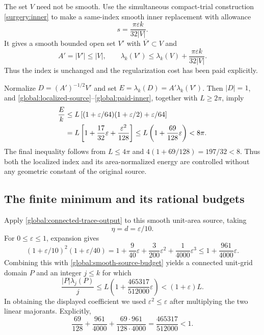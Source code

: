 \documentclass[11pt,reqno]{amsart}
\numberwithin{equation}{section}
\newcommand{\abs}[1]{\lvert#1\rvert}
\begin{document}
The set $V$ need not be smooth.  Use the simultaneous compact-trial
construction \eqref{surgery:inner} to make a same-index smooth inner
replacement with allowance
\[
 s=\frac{\pi\varepsilon k}{32\abs V}.
\]
It gives a smooth bounded open set $V'$ with
$\overline{V'}\subset V$ and
\begin{equation}
 A'=\abs{V'}\leq\abs V,
 \qquad
 \lambda_k(V')\leq\lambda_k(V)
                 +\frac{\pi\varepsilon k}{32\abs V}.
 \label{global:paid-inner}
\end{equation}
Thus the index is unchanged and the regularization cost has been
paid explicitly.

Normalize $D=(A')^{-1/2}V'$ and set
$E=\lambda_k(D)=A'\lambda_k(V')$.  Then $\abs D=1$, and
\eqref{global:localized-source}--\eqref{global:paid-inner}, together
with $L\geq2\pi$, imply
\begin{align}
 \frac Ek
 &\leq L\left[(1+\varepsilon/64)(1+\varepsilon/2)
                      +\varepsilon/64\right]\notag\\
 &=L\left[1+\frac{17}{32}\varepsilon
                       +\frac{\varepsilon^2}{128}\right]
 \leq L\left(1+\frac{69}{128}\varepsilon\right)<8\pi.
 \label{global:smooth-source-budget}
\end{align}
The final inequality follows from $L\leq4\pi$ and
$4(1+69/128)=197/32<8$.  Thus both the localized index and its
area-normalized energy are controlled without any geometric
constant of the original source.

\subsection{The finite minimum and its rational budgets}
\label{global:catalogue-section}

Apply \eqref{global:connected-trace-output} to this smooth
unit-area source, taking
\[
 \eta=d=\varepsilon/10.
\]
For $0\leq\varepsilon\leq1$, expansion gives
\[
 (1+\varepsilon/10)^2(1+\varepsilon/40)
   =1+\frac9{40}\varepsilon+\frac3{200}\varepsilon^2
                                  +\frac1{4000}\varepsilon^3
   \leq1+\frac{961}{4000}\varepsilon.
\]
Combining this with \eqref{global:smooth-source-budget} yields a
connected unit-grid domain $P$ and an integer $j\leq k$ for which
\begin{equation}
 \frac{\abs P\lambda_j(P)}j
   \leq L\left(1+\frac{465317}{512000}\varepsilon\right)
   <(1+\varepsilon)L.
 \label{global:final-ratio}
\end{equation}
In obtaining the displayed coefficient we used
$\varepsilon^2\leq\varepsilon$ after multiplying the two linear
majorants.  Explicitly,
\[
 \frac{69}{128}+\frac{961}{4000}
       +\frac{69\cdot961}{128\cdot4000}
       =\frac{465317}{512000}<1.
\]
\end{document}
